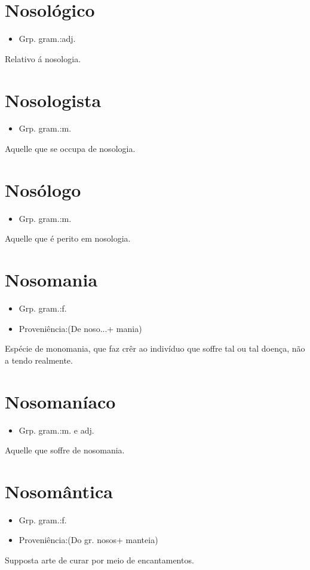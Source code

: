 \section{Nosológico}
\begin{itemize}
\item {Grp. gram.:adj.}
\end{itemize}
Relativo á nosologia.
\section{Nosologista}
\begin{itemize}
\item {Grp. gram.:m.}
\end{itemize}
Aquelle que se occupa de nosologia.
\section{Nosólogo}
\begin{itemize}
\item {Grp. gram.:m.}
\end{itemize}
Aquelle que é perito em nosologia.
\section{Nosomania}
\begin{itemize}
\item {Grp. gram.:f.}
\end{itemize}
\begin{itemize}
\item {Proveniência:(De \textunderscore noso...\textunderscore  + \textunderscore mania\textunderscore )}
\end{itemize}
Espécie de monomania, que faz crêr ao indivíduo que soffre tal ou tal doença, não a tendo realmente.
\section{Nosomaníaco}
\begin{itemize}
\item {Grp. gram.:m.  e  adj.}
\end{itemize}
Aquelle que soffre de nosomania.
\section{Nosomântica}
\begin{itemize}
\item {Grp. gram.:f.}
\end{itemize}
\begin{itemize}
\item {Proveniência:(Do gr. \textunderscore nosos\textunderscore  + \textunderscore manteia\textunderscore )}
\end{itemize}
Supposta arte de curar por meio de encantamentos.

